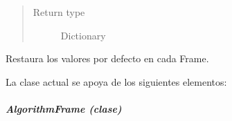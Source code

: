 \documentclass[letterpaper,10pt,english]{sphinxmanual}
\begin{document}
\begin{fulllineitems}
\begin{fulllineitems}
\begin{quote}
\begin{description}
\item[{Return type}] \leavevmode
Dictionary

\end{description}\end{quote}

\end{fulllineitems}


\begin{fulllineitems}
\label{View/Main/MOEA/MOEAFrame:View.Main.MOEA.MOEAFrame.MOEAFrame.restore_settings}
Restaura los valores por defecto en cada Frame.

\end{fulllineitems}


\end{fulllineitems}


La clase actual se apoya de los siguientes elementos:


\subparagraph{AlgorithmFrame (clase)}
\label{View/Main/MOEA/AlgorithmFrame:algorithmframe-clase}\label{View/Main/MOEA/AlgorithmFrame::doc}\label{View/Main/MOEA/AlgorithmFrame:module-View.Main.MOEA.AlgorithmFrame}
\end{document}
